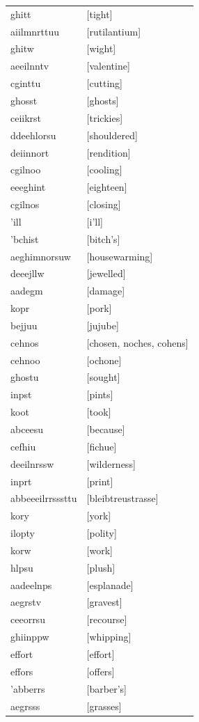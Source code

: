\documentclass{article}
\begin{document}
\begin{tabular}{ll}
ghitt & [tight] \\
aiilmnrttuu & [rutilantium] \\
ghitw & [wight] \\
aeeilnntv & [valentine] \\
cginttu & [cutting] \\
ghosst & [ghosts] \\
ceiikrst & [trickies] \\
ddeehlorsu & [shouldered] \\
deiinnort & [rendition] \\
cgilnoo & [cooling] \\
eeeghint & [eighteen] \\
cgilnos & [closing] \\
'ill & [i'll] \\
'bchist & [bitch's] \\
aeghimnorsuw & [housewarming] \\
deeejllw & [jewelled] \\
aadegm & [damage] \\
kopr & [pork] \\
bejjuu & [jujube] \\
cehnos & [chosen, noches, cohens] \\
cehnoo & [ochone] \\
ghostu & [sought] \\
inpst & [pints] \\
koot & [took] \\
abceesu & [because] \\
cefhiu & [fichue] \\
deeilnrssw & [wilderness] \\
inprt & [print] \\
abbeeeilrrsssttu & [bleibtreustrasse] \\
kory & [york] \\
ilopty & [polity] \\
korw & [work] \\
hlpsu & [plush] \\
aadeelnps & [esplanade] \\
aegrstv & [gravest] \\
ceeorrsu & [recourse] \\
ghiinppw & [whipping] \\
effort & [effort] \\
effors & [offers] \\
'abberrs & [barber's] \\
aegrsss & [grasses] \\

\end{tabular}
\end{document}

